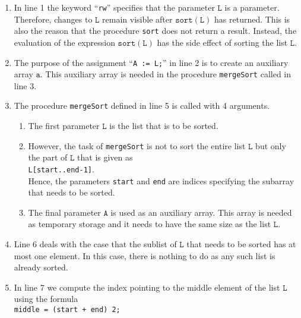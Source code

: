 \begin{enumerate}
\item In line 1 the keyword ``\texttt{rw}'' specifies that the parameter $\mathtt{L}$ is a
       parameter.  Therefore, changes to $\mathtt{L}$ remain
      visible after $\texttt{sort}(\mathtt{L})$ has returned.  This is also the reason that the procedure 
      \texttt{sort} does not return a result.  Instead, the evaluation of the expression
      $\mathtt{sort}(\mathtt{L})$ has the side effect of sorting the list $\mathtt{L}$.
\item The purpose of the assignment ``\texttt{A := L;}'' in line 2 is to create an auxiliary array
      $\mathtt{a}$.  This auxiliary array is needed in the procedure
      \texttt{mergeSort} called in line 3.
\item The procedure \texttt{mergeSort} defined in line 5 is called with 4 arguments.
      \begin{enumerate}
      \item The first parameter $\mathtt{L}$ is the list that is to be sorted.
      \item However, the task of \texttt{mergeSort} is not to sort the entire list $\mathtt{L}$ but only
            the part of $\mathtt{L}$ that is given as
            \\[0.2cm]
            \hspace*{1.3cm} 
            \texttt{L[start..end-1]}. 
            \\[0.2cm]
            Hence, the parameters \texttt{start} and \texttt{end} are indices specifying the 
            subarray that needs to be sorted.
      \item The final parameter $\mathtt{A}$ is used as an auxiliary array.  This array is needed
            as temporary storage and it needs to have the same size as the list $\mathtt{L}$.
      \end{enumerate} 
\item Line 6 deals with the case that the sublist of $\mathtt{L}$ that needs to be sorted has at most one element.  
      In this case, there is nothing to do as any such list is already sorted.
\item In line 7 we compute the index pointing to the middle element of the list $\mathtt{L}$ using the
      formula \\[0.2cm]
      \hspace*{1.3cm} 
      \texttt{middle = (start + end)  2;} 
      \\[0.2cm]

\end{enumerate}
